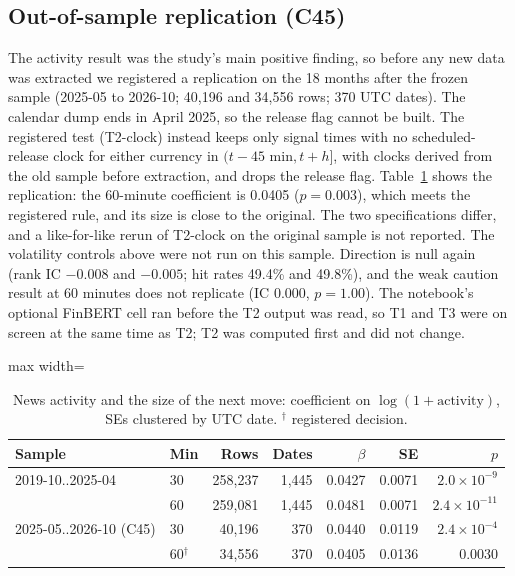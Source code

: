 \documentclass[conference]{IEEEtran}
\begin{document}
\subsection{Out-of-sample replication (C45)}
The activity result was the study's main positive finding, so before any new data was extracted we
registered a replication on the 18 months after the frozen sample (2025-05 to 2026-10; 40,196
and 34,556 rows; 370 UTC dates). The calendar dump ends in April 2025, so the release flag cannot
be built. The registered test (T2-clock) instead keeps only signal times with no scheduled-release
clock for either currency in $(t-45\text{ min},t+h]$, with clocks derived from the old sample
before extraction, and drops the release flag. Table~\ref{tab:c45} shows the replication: the
60-minute coefficient is 0.0405 ($p=0.003$), which meets the registered rule, and its size is close
to the original. The two specifications differ, and a like-for-like rerun of T2-clock on the
original sample is not reported. The volatility controls above were not run on this sample.
Direction is null again (rank IC $-0.008$ and $-0.005$; hit rates
49.4\% and 49.8\%), and the weak caution result at 60 minutes does not replicate (IC 0.000,
$p=1.00$). The notebook's optional FinBERT cell ran before the T2 output was read, so T1 and T3
were on screen at the same time as T2; T2 was computed first and did not change.

\begin{table}[t]\centering\footnotesize
\caption{News activity and the size of the next move: coefficient on $\log(1+\text{activity})$, SEs
clustered by UTC date. $^\dagger$ registered decision.}\label{tab:c45}
\begin{adjustbox}{max width=\columnwidth}
\begin{tabular}{@{}llrrrrr@{}}
\toprule
Sample & Min & Rows & Dates & $\beta$ & SE & $p$\\
\midrule
2019-10..2025-04 & 30 & 258,237 & 1,445 & 0.0427 & 0.0071 & $2.0\times10^{-9}$\\
 & 60 & 259,081 & 1,445 & 0.0481 & 0.0071 & $2.4\times10^{-11}$\\
2025-05..2026-10 (C45) & 30 & 40,196 & 370 & 0.0440 & 0.0119 & $2.4\times10^{-4}$\\
 & 60$^\dagger$ & 34,556 & 370 & 0.0405 & 0.0136 & 0.0030\\
\bottomrule
\end{tabular}
\end{adjustbox}
\end{table}
\end{document}
